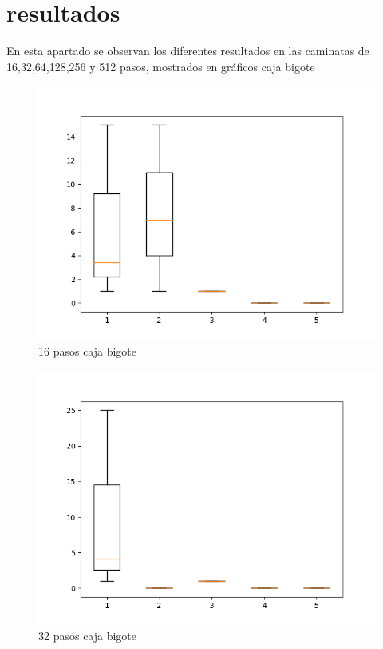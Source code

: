 \documentclass[a4paper]{article}
\begin{document}
\section{resultados}
En esta apartado se observan los diferentes resultados en las caminatas de 16,32,64,128,256 y 512 pasos, mostrados en gráficos caja bigote 
    \begin{figure}[H]
      \centering                      %
      \includegraphics[scale=.5]{16_pasos.png} 
      \caption{16 pasos caja bigote} 
      \label{cam16}
    \end{figure}

    \begin{figure}[H]
      \centering                      %
      \includegraphics[scale=.5]{32_pasos.png} 
      \caption{32 pasos caja bigote} 
      \label{cam32}
    \end{figure}
\end{document}
